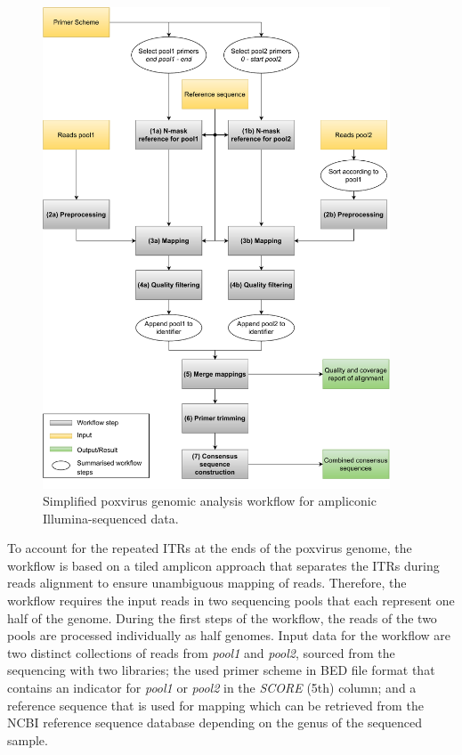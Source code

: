 \begin{figure}[ht!]
	\includegraphics[width=0.92\textwidth]{media/3-pox.pdf}
	\caption{Simplified poxvirus genomic analysis workflow for ampliconic Illumina-sequenced data.}
	\label{fig:3-pox-wf}
\end{figure}

To account for the repeated \acp{ITR} at the ends of the poxvirus genome, the workflow is based on a tiled amplicon approach that separates the \acp{ITR} during reads alignment to ensure unambiguous mapping of reads. Therefore, the workflow requires the input reads in two sequencing pools that each represent one half of the genome. During the first steps of the workflow, the reads of the two pools are processed individually as half genomes. Input data for the workflow are two distinct collections of reads from \textit{pool1} and \textit{pool2}, sourced from the sequencing with two libraries; the used primer scheme in \ac{BED} file format that contains an indicator for \textit{pool1} or \textit{pool2} in the \textit{SCORE} (5th) column; and a reference sequence that is used for mapping which can be retrieved from the \ac{NCBI} reference sequence database depending on the genus of the sequenced sample. \\

